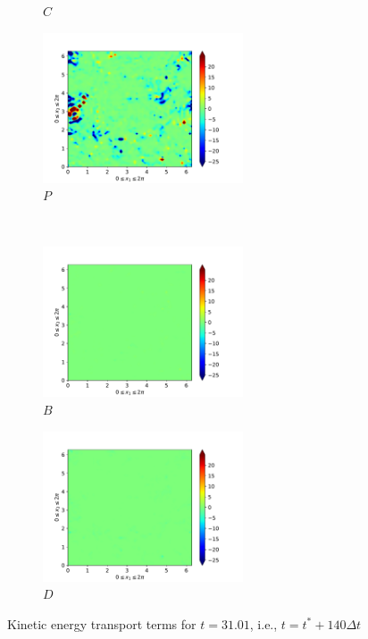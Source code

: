 \begin{figure}[H]
\begin{subfigure}{0.45\textwidth}
        \caption{$C$}
    \end{subfigure}
    \newline
    \begin{subfigure}{0.45\textwidth}
        \includegraphics[height=1.75in]{media/run-cds-65/P-ke-1480}
        \caption{$P$}
    \end{subfigure}
    ~
    \begin{subfigure}{0.45\textwidth}
        \includegraphics[height=1.75in]{media/run-cds-65/B-ke-1480}
        \caption{$B$}
    \end{subfigure}
    \newline
    \begin{subfigure}{0.45\textwidth}
        \includegraphics[height=1.75in]{media/run-cds-65/D-ke-1480}
        \caption{$D$}
    \end{subfigure}
    \caption{Kinetic energy transport terms for $t=31.01$, i.e., $t=t^{\ast} + 140 \Delta t$}
\end{figure}
